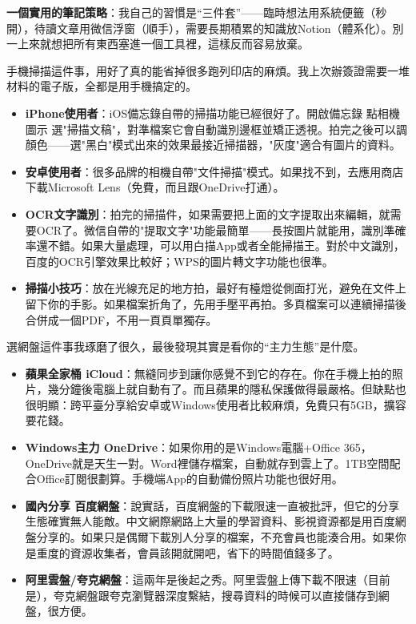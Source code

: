 \textbf{一個實用的筆記策略}：我自己的習慣是“三件套”——臨時想法用系統便籤（秒開），待讀文章用微信浮窗（順手），需要長期積累的知識放Notion（體系化）。別一上來就想把所有東西塞進一個工具裡，這樣反而容易放棄。


手機掃描這件事，用好了真的能省掉很多跑列印店的麻煩。我上次辦簽證需要一堆材料的電子版，全都是用手機搞定的。

\begin{itemize}
  \item \textbf{iPhone使用者}：iOS備忘錄自帶的掃描功能已經很好了。開啟備忘錄 點相機圖示 選"掃描文稿"，對準檔案它會自動識別邊框並矯正透視。拍完之後可以調顏色——選"黑白"模式出來的效果最接近掃描器，"灰度"適合有圖片的資料。
  \item \textbf{安卓使用者}：很多品牌的相機自帶"文件掃描"模式。如果找不到，去應用商店下載Microsoft Lens（免費，而且跟OneDrive打通）。
  \item \textbf{OCR文字識別}：拍完的掃描件，如果需要把上面的文字提取出來編輯，就需要OCR了。微信自帶的"提取文字"功能最簡單——長按圖片就能用，識別準確率還不錯。如果大量處理，可以用白描App或者全能掃描王。對於中文識別，百度的OCR引擎效果比較好；WPS的圖片轉文字功能也很準。
  \item \textbf{掃描小技巧}：放在光線充足的地方拍，最好有檯燈從側面打光，避免在文件上留下你的手影。如果檔案折角了，先用手壓平再拍。多頁檔案可以連續掃描後合併成一個PDF，不用一頁頁單獨存。
\end{itemize}


選網盤這件事我琢磨了很久，最後發現其實是看你的“主力生態”是什麼。

\begin{itemize}
  \item \textbf{蘋果全家桶 iCloud}：無縫同步到讓你感覺不到它的存在。你在手機上拍的照片，幾分鐘後電腦上就自動有了。而且蘋果的隱私保護做得最嚴格。但缺點也很明顯：跨平臺分享給安卓或Windows使用者比較麻煩，免費只有5GB，擴容要花錢。
  \item \textbf{Windows主力 OneDrive}：如果你用的是Windows電腦+Office 365，OneDrive就是天生一對。Word裡儲存檔案，自動就存到雲上了。1TB空間配合Office訂閱很劃算。手機端App的自動備份照片功能也很好用。
  \item \textbf{國內分享 百度網盤}：說實話，百度網盤的下載限速一直被批評，但它的分享生態確實無人能敵。中文網際網路上大量的學習資料、影視資源都是用百度網盤分享的。如果只是偶爾下載別人分享的檔案，不充會員也能湊合用。如果你是重度的資源收集者，會員該開就開吧，省下的時間值錢多了。
  \item \textbf{阿里雲盤/夸克網盤}：這兩年是後起之秀。阿里雲盤上傳下載不限速（目前是），夸克網盤跟夸克瀏覽器深度繫結，搜尋資料的時候可以直接儲存到網盤，很方便。
\end{itemize}

